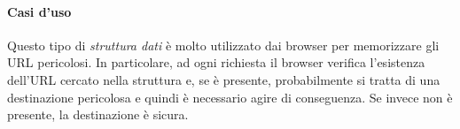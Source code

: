 \paragraph{Casi d'uso}
Questo tipo di \emph{struttura dati} è molto utilizzato dai browser per
memorizzare gli URL pericolosi. In particolare, ad ogni richiesta il browser
verifica l'esistenza dell'URL cercato nella struttura e, se è presente,
probabilmente si tratta di una destinazione pericolosa e quindi è necessario
agire di conseguenza. Se invece non è presente, la destinazione è sicura.